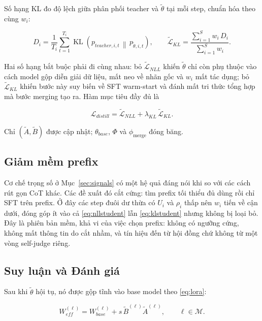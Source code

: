 \documentclass[12pt,a4paper]{article}
\DeclareMathOperator{\KL}{KL}
\newcommand{\pmerge}{\phi_{\mathrm{merge}}}
\begin{document}
Số hạng KL đo độ lệch giữa phân phối teacher và $\tilde\theta$ tại mỗi step, chuẩn hóa theo cùng $w_i$:

\begin{equation}
\label{eq:klstudent}
D_i = \frac{1}{T_i}\sum_{t=1}^{T_i} \KL\!\left(p_{teacher,i,t} \,\middle\|\, p_{\tilde\theta,i,t}\right),
\qquad
\widetilde{\mathcal{L}}_{KL} = \frac{\sum_{i=1}^{S} w_i\, D_i}{\sum_{i=1}^{S} w_i}.
\end{equation}

Hai số hạng bắt buộc phải đi cùng nhau: bỏ $\widetilde{\mathcal{L}}_{NLL}$ khiến $\tilde\theta$ chỉ còn phụ thuộc vào cách model gộp diễn giải dữ liệu, mất neo về nhãn gốc và $w_i$ mất tác dụng; bỏ $\widetilde{\mathcal{L}}_{KL}$ khiến bước này suy biến về SFT warm-start và đánh mất tri thức tổng hợp mà bước merging tạo ra. Hàm mục tiêu đầy đủ là

\begin{equation}
\label{eq:distill}
\mathcal{L}_{distill} = \widetilde{\mathcal{L}}_{NLL} + \lambda_{KL}\,\widetilde{\mathcal{L}}_{KL}.
\end{equation}

Chỉ $(\tilde A, \tilde B)$ được cập nhật; $\theta_{base}$, $\Phi$ và $\pmerge$ đóng băng.

\subsection{Giảm mềm prefix}
\label{sec:softtrunc}

Cơ chế trọng số ở Mục~\ref{sec:signals} có một hệ quả đáng nói khi so với các cách rút gọn CoT khác. Các đề xuất đó cắt cứng: tìm prefix tối thiểu đủ dùng rồi chỉ SFT trên prefix. Ở đây các step đuôi dư thừa có $U_i$ và $\rho_i$ thấp nên $w_i$ tiến về cận dưới, đóng góp ít vào cả \eqref{eq:nllstudent} lẫn \eqref{eq:klstudent} nhưng không bị loại bỏ. Đây là phiên bản mềm, khả vi của việc chọn prefix: không có ngưỡng cứng, không mất thông tin do cắt nhầm, và tín hiệu đến từ hội đồng chứ không từ một vòng self-judge riêng.

\subsection{Suy luận và Đánh giá}
\label{sec:inference}

Sau khi $\tilde\theta$ hội tụ, nó được gộp tĩnh vào base model theo \eqref{eq:lora}:

\begin{equation}
\label{eq:weffstudent}
W_{eff}^{(\ell)} = W_{base}^{(\ell)} + s\,\tilde B^{(\ell)} \tilde A^{(\ell)}, \qquad \ell \in \mathcal M.
\end{equation}
\end{document}
